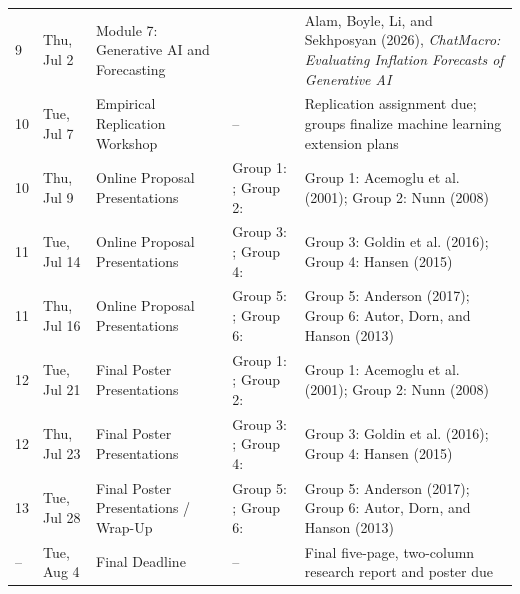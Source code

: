 \documentclass[11pt]{article}
\begin{document}
\begin{adjustbox}{max width=\textwidth, max totalheight=0.84\textheight, keepaspectratio}
\begin{tabularx}{\textwidth}{@{}L{0.045\textwidth} L{0.075\textwidth} L{0.20\textwidth} L{0.13\textwidth} X@{}}
9 & Thu, Jul 2 & Module 7: Generative AI and Forecasting & \underline{\hspace{2.1cm}} & Alam, Boyle, Li, and Sekhposyan (2026), \textit{ChatMacro: Evaluating Inflation Forecasts of Generative AI} \\

10 & Tue, Jul 7 & Empirical Replication Workshop & -- & Replication assignment due; groups finalize machine learning extension plans \\

10 & Thu, Jul 9 & Online Proposal Presentations & Group 1: \underline{\hspace{1.4cm}}; Group 2: \underline{\hspace{1.4cm}} & Group 1: Acemoglu et al. (2001); Group 2: Nunn (2008) \\

11 & Tue, Jul 14 & Online Proposal Presentations & Group 3: \underline{\hspace{1.4cm}}; Group 4: \underline{\hspace{1.4cm}} & Group 3: Goldin et al. (2016); Group 4: Hansen (2015) \\

11 & Thu, Jul 16 & Online Proposal Presentations & Group 5: \underline{\hspace{1.4cm}}; Group 6: \underline{\hspace{1.4cm}} & Group 5: Anderson (2017); Group 6: Autor, Dorn, and Hanson (2013) \\

12 & Tue, Jul 21 & Final Poster Presentations & Group 1: \underline{\hspace{1.4cm}}; Group 2: \underline{\hspace{1.4cm}} & Group 1: Acemoglu et al. (2001); Group 2: Nunn (2008) \\

12 & Thu, Jul 23 & Final Poster Presentations & Group 3: \underline{\hspace{1.4cm}}; Group 4: \underline{\hspace{1.4cm}} & Group 3: Goldin et al. (2016); Group 4: Hansen (2015) \\

13 & Tue, Jul 28 & Final Poster Presentations / Wrap-Up & Group 5: \underline{\hspace{1.4cm}}; Group 6: \underline{\hspace{1.4cm}} & Group 5: Anderson (2017); Group 6: Autor, Dorn, and Hanson (2013) \\

-- & Tue, Aug 4 & Final Deadline & -- & Final five-page, two-column research report and poster due \\

\bottomrule
\end{tabularx}
\end{adjustbox}
\end{document}

